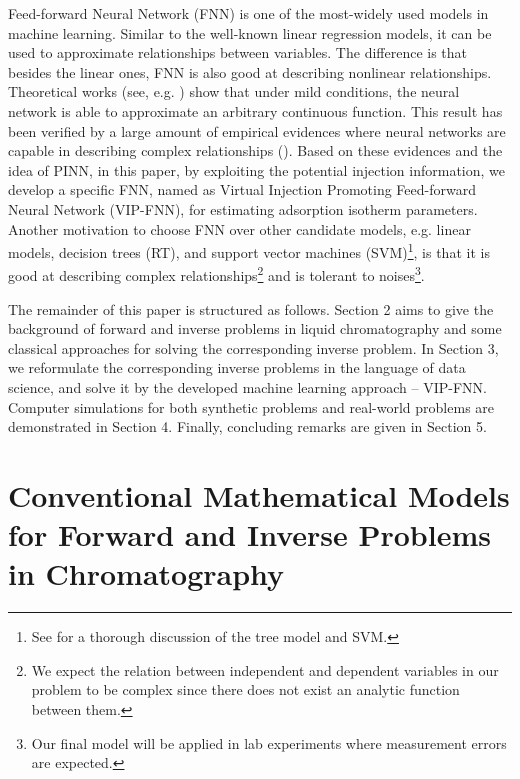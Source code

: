 \documentclass[thmsa,onecolumn,12pt]{article}%
\begin{document}
Feed-forward Neural Network (FNN) is one of the most-widely used models in machine learning. Similar to the well-known linear regression models, it can be used to approximate relationships between variables. The difference is that besides the linear ones, FNN is also good at describing nonlinear relationships. Theoretical works (see, e.g. \cite{Kurt1990}) show that under mild conditions, the neural network is able to approximate an arbitrary continuous function. This result has been verified by a large amount of empirical evidences where neural networks are capable in describing complex relationships (\cite{Gu-Kelly-Xiu-2020, alfaro2008, fletcher1993, Morshed1998}). Based on these evidences and the idea of PINN, in this paper, by exploiting the potential injection information, we develop a specific FNN, named as Virtual Injection Promoting Feed-forward Neural Network (VIP-FNN), for estimating adsorption isotherm parameters. Another motivation to choose FNN over other candidate models, e.g. linear models, decision trees (RT), and support vector machines (SVM)\footnote{See \cite{Hastie2009} for a thorough discussion of the tree model and SVM.}, is that it is good at describing complex relationships\footnote{We expect the relation between independent and dependent variables in our problem to be complex since there does not exist an analytic function between them.} and is tolerant to noises\footnote{Our final model will be applied in lab experiments where measurement errors are expected.}.


The remainder of this paper is structured as follows. Section 2 aims to give  the  background of forward and inverse problems in liquid chromatography and some classical approaches for solving the corresponding inverse problem. In Section 3, we reformulate the corresponding inverse problems in the language of data science, and solve it by the developed machine learning approach -- VIP-FNN. Computer simulations for both synthetic problems and real-world problems are demonstrated in Section 4. Finally, concluding remarks are given in Section 5.





\section{Conventional Mathematical Models for Forward and Inverse Problems in Chromatography}
\label{basis}
\end{document}
